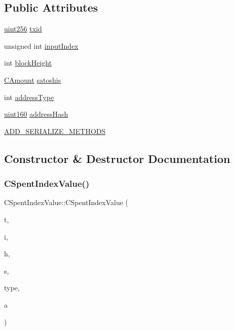 \subsection*{Public Attributes}
\begin{DoxyCompactItemize}
\item 
\mbox{\hyperlink{classuint256}{uint256}} \mbox{\hyperlink{struct_c_spent_index_value_aad16faff9e2d74359d977986911bac33}{txid}}
\item 
unsigned int \mbox{\hyperlink{struct_c_spent_index_value_a1f66a53ec4ef540b51e4787e842ae88c}{input\+Index}}
\item 
int \mbox{\hyperlink{struct_c_spent_index_value_ad2e454112b9830af46480a9ee3040fb4}{block\+Height}}
\item 
\mbox{\hyperlink{amount_8h_a4eaf3a5239714d8c45b851527f7cb564}{C\+Amount}} \mbox{\hyperlink{struct_c_spent_index_value_a4dc408ea5e141e426395091a692f39cc}{satoshis}}
\item 
int \mbox{\hyperlink{struct_c_spent_index_value_ad942d5cdcbe531184ca8050ba583fa97}{address\+Type}}
\item 
\mbox{\hyperlink{classuint160}{uint160}} \mbox{\hyperlink{struct_c_spent_index_value_a2aeee131cb911ca46d4a59daadf10c3e}{address\+Hash}}
\item 
\mbox{\hyperlink{struct_c_spent_index_value_ab0aeeb8b997ba0d025b40663efcc178c}{A\+D\+D\+\_\+\+S\+E\+R\+I\+A\+L\+I\+Z\+E\+\_\+\+M\+E\+T\+H\+O\+DS}}
\end{DoxyCompactItemize}


\subsection{Constructor \& Destructor Documentation}
\mbox{\label{struct_c_spent_index_value_a1b4bd7a916283df5d46a685ab442e299}} 
\subsubsection{\texorpdfstring{C\+Spent\+Index\+Value()}{CSpentIndexValue()}\hspace{0.1cm}{\footnotesize\ttfamily [1/2]}}
{\footnotesize\ttfamily C\+Spent\+Index\+Value\+::\+C\+Spent\+Index\+Value (\begin{DoxyParamCaption}\item[{\mbox{\hyperlink{classuint256}{uint256}}}]{t,  }\item[{unsigned int}]{i,  }\item[{int}]{h,  }\item[{\mbox{\hyperlink{amount_8h_a4eaf3a5239714d8c45b851527f7cb564}{C\+Amount}}}]{s,  }\item[{int}]{type,  }\item[{\mbox{\hyperlink{classuint160}{uint160}}}]{a }\end{DoxyParamCaption})\hspace{0.3cm}{\ttfamily [inline]}}

